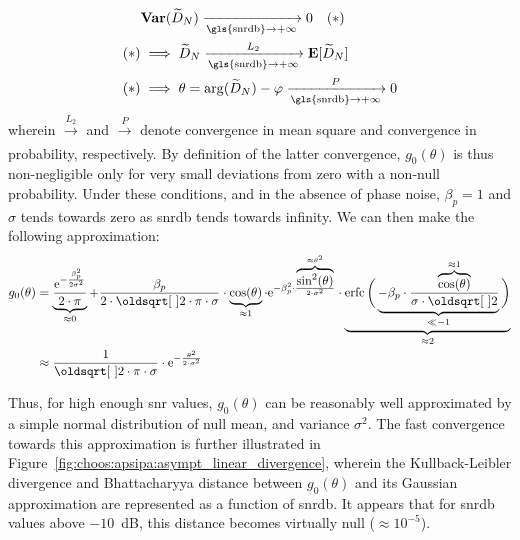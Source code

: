 \begin{equation}
	\begin{aligned}
		&\var (\widetilde{D}_N) \xrightarrow[\text{\gls{snrdb}}\rightarrow + \infty]{} 0\quad(*)\\
		(*) &\implies \widetilde{D}_N \xrightarrow[\text{\gls{snrdb}}\rightarrow + \infty]{L_2} \esp [ \widetilde{D}_N ]\\
		(*) &\implies \theta = \arg (\widetilde{D}_N) - \varphi \xrightarrow[\text{\gls{snrdb}}\rightarrow + \infty]{P} 0
	\end{aligned}
\end{equation}
wherein $\xrightarrow[]{L_2}$ and $\xrightarrow[]{P}$ denote convergence in mean square and convergence in probability, respectively. By definition of the latter convergence, $g_0(\theta)$ is thus non-negligible only for very small deviations from zero with a non-null probability. Under these conditions, and in the absence of phase noise, $\beta_p = 1$ and $\sigma$ tends towards zero as \gls{snrdb} tends towards infinity. We can then make the following approximation:
\begin{equation}\label{eq:choos:apsipa:approx_gaussian}
	\begin{aligned}
		g_0(\theta) &= \underbrace{\frac{\e^{-\frac{\beta_p^2}{2 \sigma^2}}}{2\cdot \pi}}_{\approx 0} + \frac{\beta_p}{2 \cdot \sqrt{2 \cdot \pi} \cdot \sigma} \cdot \underbrace{\cos(\theta)}_{\approx 1} \cdot \e^{-\beta_p^2 \cdot \frac{\overbrace{\sin^2(\theta)}^{\approx \theta^2}}{2\cdot \sigma^2}} \cdot \underbrace{\erfc\bigg(\underbrace{- \beta_p \cdot \frac{\overbrace{\cos(\theta)}^{\approx 1}}{\sigma \cdot \sqrt{2}}}_{\ll -1}\bigg)}_{\approx 2}\\
		&\approx \frac{1}{\sqrt{2 \cdot \pi} \cdot 	\sigma} \cdot \e^{-\frac{\theta^2}{2\cdot \sigma^2}}
	\end{aligned}
\end{equation}

Thus, for high enough \gls{snr} values, $g_0(\theta)$ can be reasonably well approximated by a simple normal distribution of null mean, and variance $\sigma^2$. The fast convergence towards this approximation is further illustrated in Figure~\ref{fig:choos:apsipa:asympt_linear_divergence}, wherein the Kullback-Leibler divergence and Bhattacharyya distance between $g_0(\theta)$ and its Gaussian approximation are represented as a function of \gls{snrdb}. It appears that for \gls{snrdb} values above $-10$~dB, this distance becomes virtually null ($\approx 10^{-5}$).

